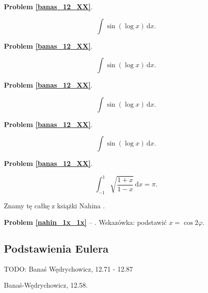 \textbf{Problem \ref{banas_12_XX}}.

\begin{problem_with_solution}
    \label{banas_12_XX}%
    \begin{equation}
        \int \sin(\log x) \, \mathrm{d}x.
    \end{equation}
\end{problem_with_solution}

\textbf{Problem \ref{banas_12_XX}}.

\begin{problem_with_solution}
    \label{banas_12_XX}%
    \begin{equation}
        \int \sin(\log x) \, \mathrm{d}x.
    \end{equation}
\end{problem_with_solution}

\textbf{Problem \ref{banas_12_XX}}.

\begin{problem_with_solution}
    \label{banas_12_XX}%
    \begin{equation}
        \int \sin(\log x) \, \mathrm{d}x.
    \end{equation}
\end{problem_with_solution}

\textbf{Problem \ref{banas_12_XX}}.

\begin{problem_with_solution}
    \label{banas_12_XX}%
    \begin{equation}
        \int \sin(\log x) \, \mathrm{d}x.
    \end{equation}
\end{problem_with_solution}

\textbf{Problem \ref{banas_12_XX}}.

\begin{problem_with_solution}
    \label{nahin_1x_1x}%
    \begin{equation}
        \int_{-1}^1 \sqrt{\frac{1+x}{1-x}} \,\mathrm{d}x = \pi.
    \end{equation}
\end{problem_with_solution}

Znamy tę całkę z książki Nahina \cite{nahin15}.

\textbf{Problem \ref{nahin_1x_1x}} -- \cite[s. 115, 378]{nahin15}.
Wskazówka: podstawić $x = \cos 2 \varphi$.

\subsection{Podstawienia Eulera}

TODO: Banaś Wędrychowicz, 12.71 - 12.87

\begin{problem}
    Banaś-Wędrychowicz, 12.58.
\end{problem}

%